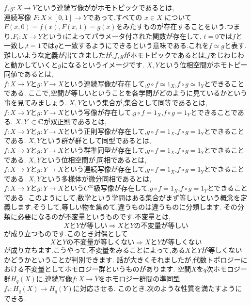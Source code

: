 $f,g:X\to Y$という連続写像ががホモトピックであるとは,\\
連続写像 $F : X \times [0, 1] \to Y$であって,すべての $x \in X$ について$ F(x, 0) = f(x), F(x, 1) = g(x) $をみたすものが存在することをいう.つまり,$F_t :X\to Y$という$t$によってパラメータ付された関数が存在して,
$t=0$では$f$と一致し,$t=1$では$g$と一致するようにできるという意味である.これを$f\simeq g$と表す.
難しいような定義が出てきましたが,$f,g$がホモトピックであるとは,$f$をじわじわと動かしていくと$g$になるというイメージです.
$X,Y$という位相空間がホモトピー同値であるとは,\\
$f:X\to Y$と$g:Y\to X$という連続写像が存在して,$g \circ f \simeq 1_X$,$f \circ g \simeq 1_Y$とできることである.
ここで,空間が等しいということを各学問がどのように見ているかという事を見てみましょう.
$X,Y$という集合が,集合として同等であるとは,\\
$f:X\to Y$と$g:Y\to X$という写像が存在して,$g \circ f = 1_X$,$f \circ g = 1_Y$とできることである.
{}
$X,Y \subset \mathbb C$が双正則であるとは,\\
$f:X\to Y$と$g:Y\to X$という正則写像が存在して,$g \circ f = 1_X$,$f \circ g = 1_Y$とできることである.
{}
$X,Y$という群が群として同型であるとは,\\
$f:X\to Y$と$g:Y\to X$という群準同型が存在して,$g \circ f = 1_X$,$f \circ g = 1_Y$とできることである.
{}
$X,Y$という位相空間が,同相であるとは,\\
$f:X\to Y$と$g:Y\to X$という連続写像が存在して,$g \circ f = 1_X$,$f \circ g = 1_Y$とできることである.
{}
$X,Y$という多様体が微分同相であるとは,\\
$f:X\to Y$と$g:Y\to X$という$C^\infty$級写像が存在して,$g \circ f = 1_X$,$f \circ g = 1_Y$とできることである.
このようにして,数学という学問はある集合がまず等しいという概念を定義します.そうして,等しい物を集めて,違うものは違うものに分類します. その分類に必要になるのが\underline{不変量}というものです.不変量とは,
\[
X と Y が等しい \Rightarrow XとYの不変量が等しい
\]
が成り立つものです.このとき対偶として
\[
 XとYの不変量が等しくない \Rightarrow X と Y が等しくない
\]
が成り立ちます.こうやって,不変量をみることによって,ある$X$と$Y$が等しくないかどうかということが判別できます.
話が大きくそれましたが,代数トポロジーにおける不変量としてホモロジー群というものがあります.
空間$X$を$q$次ホモロジー群$H_q(X)$に,連続写像$f:X\to Y$をホモロジー群間の準同型$f_* : H_q(X) \to H_q(Y)$に対応させる.
このとき,次のような性質を満たすようにできる.\\
